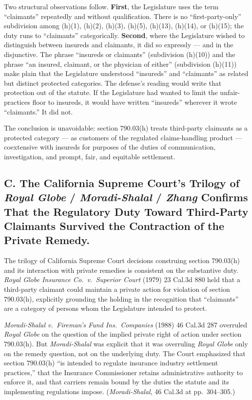 Two structural observations follow. \textbf{First}, the Legislature uses the term ``claimants'' repeatedly and without qualification. There is no ``first-party-only'' subdivision among (h)(1), (h)(2), (h)(3), (h)(5), (h)(13), (h)(14), or (h)(15); the duty runs to ``claimants'' categorically. \textbf{Second}, where the Legislature wished to distinguish between insureds and claimants, it did so expressly --- and in the disjunctive. The phrase ``insureds or claimants'' (subdivision (h)(10)) and the phrase ``an insured, claimant, or the physician of either'' (subdivision (h)(11)) make plain that the Legislature understood ``insureds'' and ``claimants'' as related but distinct protected categories. The defense's reading would write that protection out of the statute. If the Legislature had wanted to limit the unfair-practices floor to insureds, it would have written ``insureds'' wherever it wrote ``claimants.'' It did not.

The conclusion is unavoidable: section 790.03(h) treats third-party claimants as a protected category --- as customers of the regulated claims-handling product --- coextensive with insureds for purposes of the duties of communication, investigation, and prompt, fair, and equitable settlement.

\subsection*{C. The California Supreme Court's Trilogy of \textit{Royal Globe} / \textit{Moradi-Shalal} / \textit{Zhang} Confirms That the Regulatory Duty Toward Third-Party Claimants Survived the Contraction of the Private Remedy.}

The trilogy of California Supreme Court decisions construing section 790.03(h) and its interaction with private remedies is consistent on the substantive duty. \textit{Royal Globe Insurance Co.\ v.\ Superior Court} (1979) 23 Cal.3d 880 held that a third-party claimant could maintain a private action for violation of section 790.03(h), explicitly grounding the holding in the recognition that ``claimants'' are a category of persons whom the Legislature intended to protect.

\textit{Moradi-Shalal v.\ Fireman's Fund Ins.\ Companies} (1988) 46 Cal.3d 287 overruled \textit{Royal Globe} on the question of the implied private right of action under section 790.03(h). But \textit{Moradi-Shalal} was explicit that it was overruling \textit{Royal Globe} only on the remedy question, not on the underlying duty. The Court emphasized that section 790.03(h) ``is intended to regulate insurance industry settlement practices,'' that the Insurance Commissioner retains administrative authority to enforce it, and that carriers remain bound by the duties the statute and its implementing regulations impose. (\textit{Moradi-Shalal}, 46 Cal.3d at pp.\ 304--305.)

